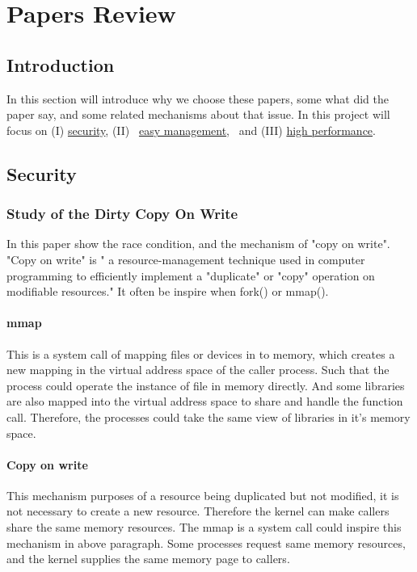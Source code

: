 \documentclass[12pt,a4paper,oneside]{IEEEconf}
\begin{document}

\section{Papers Review}
\subsection{Introduction}
In this section will introduce why we choose these papers, some what did the paper say, and
some related mechanisms about that issue.
In this project will focus on (\RN{1}) \hyperlink{security}{security}, (\RN{2}) \
\hyperlink{easy_management}{easy management}, \
and (\RN{3}) \hyperlink{heigh_performance}{high performance}.

\hypertarget{security}{\subsection{Security}}
\subsubsection{Study of the Dirty Copy On Write}
In this paper\cite{Study_Dirty_Cow} show the race condition, and the mechanism of "copy on write".
"Copy on write" is " a resource-management technique used in computer programming to
efficiently implement a "duplicate" or "copy" operation on modifiable resources."
\cite{CoW_wiki} It often be inspire when fork() or mmap().

\paragraph{mmap}
This is a system call of mapping files or devices in to memory, which creates a
new mapping in the virtual address space of the caller process. Such that
the process could operate the instance of file in memory directly.
And some libraries are also mapped into the virtual address space to share and handle
the function call. Therefore, the processes could take the same view of libraries in
it's memory space.

\paragraph{Copy on write}
This mechanism purposes of a resource being duplicated but not modified, it is not
necessary to create a new resource. Therefore the kernel can make callers share
the same memory resources. The mmap is a system call could inspire this mechanism
in above paragraph. Some processes request same memory resources, and the kernel
supplies the same memory page to callers.
\end{document}
